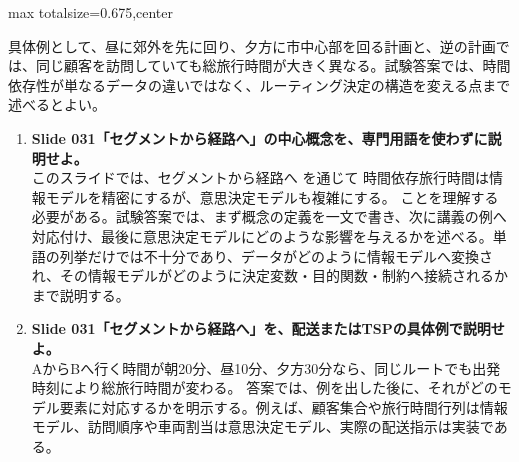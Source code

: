 \begin{adjustbox}{max totalsize={\textwidth}{0.675\textheight},center}
\begin{minipage}{\textwidth}
\begin{minipage}[t]{0.485\textwidth}
具体例として、昼に郊外を先に回り、夕方に市中心部を回る計画と、逆の計画では、同じ顧客を訪問していても総旅行時間が大きく異なる。試験答案では、時間依存性が単なるデータの違いではなく、ルーティング決定の構造を変える点まで述べるとよい。\par
{}
\begin{enumerate}
\item \textbf{Slide 031「セグメントから経路へ」の中心概念を、専門用語を使わずに説明せよ。}\\このスライドでは、セグメントから経路へ を通じて 時間依存旅行時間は情報モデルを精密にするが、意思決定モデルも複雑にする。 ことを理解する必要がある。試験答案では、まず概念の定義を一文で書き、次に講義の例へ対応付け、最後に意思決定モデルにどのような影響を与えるかを述べる。単語の列挙だけでは不十分であり、データがどのように情報モデルへ変換され、その情報モデルがどのように決定変数・目的関数・制約へ接続されるかまで説明する。
\item \textbf{Slide 031「セグメントから経路へ」を、配送またはTSPの具体例で説明せよ。}\\AからBへ行く時間が朝20分、昼10分、夕方30分なら、同じルートでも出発時刻により総旅行時間が変わる。 答案では、例を出した後に、それがどのモデル要素に対応するかを明示する。例えば、顧客集合や旅行時間行列は情報モデル、訪問順序や車両割当は意思決定モデル、実際の配送指示は実装である。
\end{enumerate}
\end{minipage}
\end{minipage}
\end{adjustbox}

